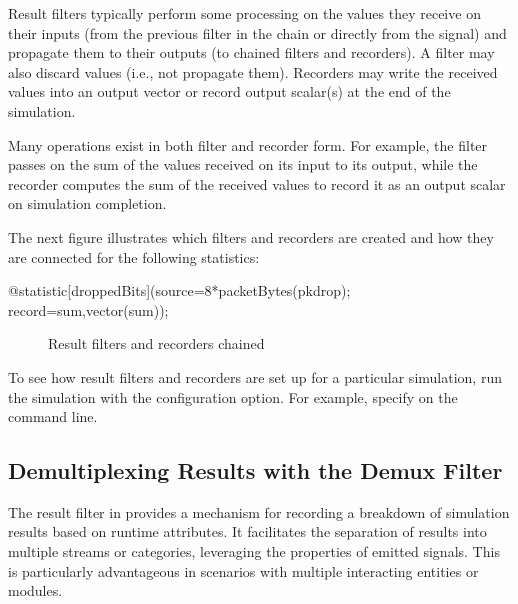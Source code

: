 Result filters typically perform some processing on the values they receive
on their inputs (from the previous filter in the chain or directly from the signal)
and propagate them to their outputs (to chained filters and recorders). A
filter may also discard values (i.e., not propagate them). Recorders may write
the received values into an output vector or record output scalar(s) at the end
of the simulation.

Many operations exist in both filter and recorder form. For example, the
 filter passes on the sum of the values received on its input to
its output, while the  recorder computes the sum of the received values
to record it as an output scalar on simulation completion.

The next figure illustrates which filters and recorders are created and how
they are connected for the following statistics:

\begin{ned}
@statistic[droppedBits](source=8*packetBytes(pkdrop); record=sum,vector(sum));
\end{ned}

\begin{figure}[htbp]
  \begin{center}
    
    \caption{Result filters and recorders chained}
  \end{center}
\end{figure}

\begin{hint}
To see how result filters and recorders are set up for a particular
simulation, run the simulation with the 
configuration option. For example, specify 
on the command line.
\end{hint}


\subsection{Demultiplexing Results with the Demux Filter}
\label{sec:simple-modules:demux-filter}

The  result filter in {\opp} provides a mechanism for
recording a breakdown of simulation results based on runtime attributes. It
facilitates the separation of results into multiple streams or categories,
leveraging the properties of emitted signals. This is particularly
advantageous in scenarios with multiple interacting entities or modules.


